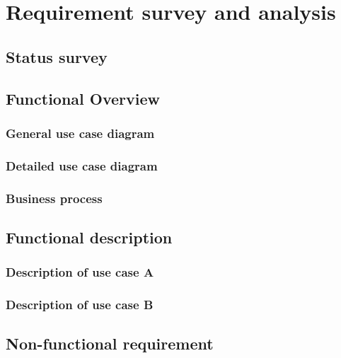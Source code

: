 \chapter{Requirement survey and analysis}
\label{chapter:requirement}

\section{Status survey}
\label{section:2.1}

\section{Functional Overview}
\label{section:2.2}

\subsection{General use case diagram}
\label{subsection:2.2.1}

\subsection{Detailed use case diagram}
\label{subsection:2.2.2}

\subsection{Business process}
\label{subsection:2.2.3}

\section{Functional description}
\label{section:2.3}

\subsection{Description of use case A}
\hfill

\subsection{Description of use case B}
\hfill

\section{Non-functional requirement}
\label{section:2.4}
